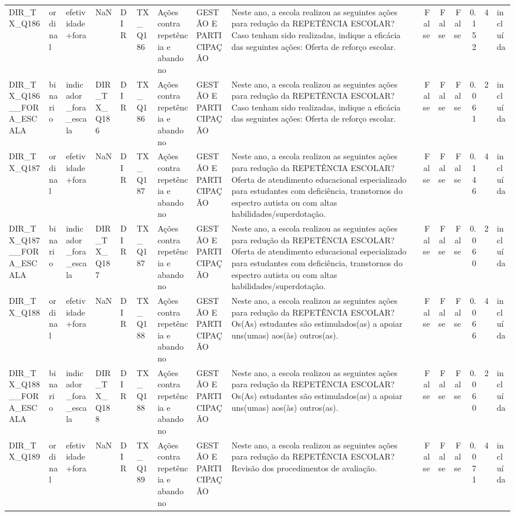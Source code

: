 \begin{tabular}{lllllllllrrrrrl}
DIR\_TX\_Q186 & ordinal & efetividade+fora & NaN & DIR & TX\_Q186 & Ações contra repetência e abandono & GESTÃO E PARTICIPAÇÃO & Neste ano, a escola realizou as seguintes ações para redução da REPETÊNCIA ESCOLAR? Caso tenham sido realizadas, indique a eficácia das seguintes ações: Oferta de reforço escolar. & False & False & False & 0.152 & 4 & incluída \\
DIR\_TX\_Q186\_\_FORA\_ESCALA & binario & indicador\_fora\_escala & DIR\_TX\_Q186 & DIR & TX\_Q186 & Ações contra repetência e abandono & GESTÃO E PARTICIPAÇÃO & Neste ano, a escola realizou as seguintes ações para redução da REPETÊNCIA ESCOLAR? Caso tenham sido realizadas, indique a eficácia das seguintes ações: Oferta de reforço escolar. & False & False & False & 0.061 & 2 & incluída \\
DIR\_TX\_Q187 & ordinal & efetividade+fora & NaN & DIR & TX\_Q187 & Ações contra repetência e abandono & GESTÃO E PARTICIPAÇÃO & Neste ano, a escola realizou as seguintes ações para redução da REPETÊNCIA ESCOLAR?  Oferta de atendimento educacional especializado para estudantes com deficiência, transtornos do espectro autista ou com altas habilidades/superdotação. & False & False & False & 0.146 & 4 & incluída \\
DIR\_TX\_Q187\_\_FORA\_ESCALA & binario & indicador\_fora\_escala & DIR\_TX\_Q187 & DIR & TX\_Q187 & Ações contra repetência e abandono & GESTÃO E PARTICIPAÇÃO & Neste ano, a escola realizou as seguintes ações para redução da REPETÊNCIA ESCOLAR?  Oferta de atendimento educacional especializado para estudantes com deficiência, transtornos do espectro autista ou com altas habilidades/superdotação. & False & False & False & 0.060 & 2 & incluída \\
DIR\_TX\_Q188 & ordinal & efetividade+fora & NaN & DIR & TX\_Q188 & Ações contra repetência e abandono & GESTÃO E PARTICIPAÇÃO & Neste ano, a escola realizou as seguintes ações para redução da REPETÊNCIA ESCOLAR? Os(As) estudantes são estimulados(as) a apoiar uns(umas) aos(às) outros(as). & False & False & False & 0.066 & 4 & incluída \\
DIR\_TX\_Q188\_\_FORA\_ESCALA & binario & indicador\_fora\_escala & DIR\_TX\_Q188 & DIR & TX\_Q188 & Ações contra repetência e abandono & GESTÃO E PARTICIPAÇÃO & Neste ano, a escola realizou as seguintes ações para redução da REPETÊNCIA ESCOLAR? Os(As) estudantes são estimulados(as) a apoiar uns(umas) aos(às) outros(as). & False & False & False & 0.060 & 2 & incluída \\
DIR\_TX\_Q189 & ordinal & efetividade+fora & NaN & DIR & TX\_Q189 & Ações contra repetência e abandono & GESTÃO E PARTICIPAÇÃO & Neste ano, a escola realizou as seguintes ações para redução da REPETÊNCIA ESCOLAR? Revisão dos procedimentos de avaliação. & False & False & False & 0.071 & 4 & incluída \\

\end{tabular}
